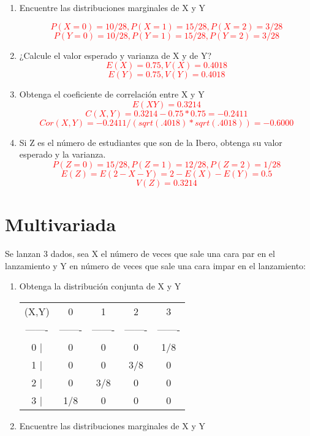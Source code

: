 \documentclass[addpoints]{exam}
\theoremstyle{mytheor}
\begin{document}
\begin{questions}
\begin{enumerate}
   \item Encuentre las distribuciones marginales de X y Y
   
    \textcolor{red}{$$P(X = 0) = 10/28, P(X = 1) = 15/28, P(X = 2) = 3/28 $$}
    \textcolor{red}{$$P(Y = 0) = 10/28, P(Y = 1) = 15/28, P(Y = 2) = 3/28 $$}
   
   \item ¿Calcule el valor esperado y varianza de X y de Y? \\
    \textcolor{red}{$$E(X) = 0.75, V(X) = 0.4018$$}
    \textcolor{red}{$$E(Y) = 0.75, V(Y) = 0.4018$$}
   \item Obtenga el coeficiente de correlación entre X y Y
    \textcolor{red}{$$E(XY) = 0.3214$$}
    \textcolor{red}{$$C(X,Y) = 0.3214-0.75*0.75 = -0.2411$$}
    \textcolor{red}{$$Cor(X,Y) = -0.2411/(sqrt(.4018)*sqrt(.4018)) = -0.6000$$}
   \item Si Z es el número de estudiantes que son de la Ibero, obtenga su valor esperado y la varianza.
    \textcolor{red}{$$P(Z = 0) = 15/28, P(Z = 1) = 12/28, P(Z = 2) = 1/28 $$}
    \textcolor{red}{$$E(Z) = E(2-X-Y) = 2-E(X)-E(Y) = 0.5$$}
    \textcolor{red}{$$V(Z) = 0.3214$$}
   \end{enumerate}
  
  
  
  \section*{Multivariada}
  
    \question Se lanzan 3 dados, sea X el número de veces que sale una cara par en el lanzamiento y Y en número de veces que sale una cara impar en el lanzamiento:
    
\begin{enumerate}
\item Obtenga la distribución conjunta de X y Y \\
\begin{center}
\begin{tabular}{ c c c c c}

 (X,Y) & 0 & 1 & 2 & 3\\ 
 ------- & ------- & ------- & ------- & -------\\
 0 | & 0 & 0 & 0 & 1/8\\  
 1 | & 0 & 0 & 3/8 & 0\\    
 2 | & 0 & 3/8 & 0 & 0\\
 3 | & 1/8 & 0 & 0 & 0  
\end{tabular}
\end{center}
   \item Encuentre las distribuciones marginales de X y Y
   

\end{enumerate}
\end{questions}
\end{document}
